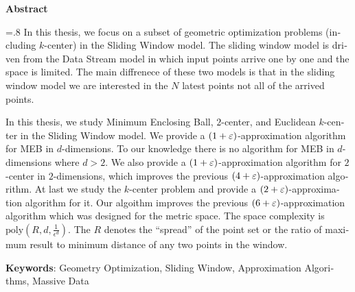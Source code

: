 


\pagestyle{empty}

\begin{latin}

\begin{center}
\textbf{Abstract}
\end{center}
\baselineskip=.8\baselineskip
In this thesis, we focus on a subset of geometric optimization problems (including $k$-center) in the Sliding Window model. The sliding window model is driven from the Data Stream model in which input points arrive one by one and the space is limited. The main diffrenece of these two models is that in the sliding window model we are interested in the $N$ latest points not all of the arrived points.

In this thesis, we study Minimum Enclosing Ball, $2$-center, and Euclidean $k$-center in the Sliding Window model. We provide a $(1+\varepsilon)$-approximation algorithm  for MEB in $d$-dimensions. To our knowledge there is no algorithm for MEB in $d$-dimensions where $d >2 $. We also provide a $(1+\varepsilon)$-approximation algorithm for $2$-center in $2$-dimensions, which improves the previous $(4+\varepsilon)$-approximation algorithm.
At last we study the $k$-center problem and provide a $(2+\varepsilon)$-approximation algorithm for it. Our algoithm improves the previous $(6+\varepsilon)$-approximation algorithm which was designed for the metric space. The space complexity is $\text{poly}(R, d, \frac{1}{\epsilon^d})$. The $R$ denotes the
“spread” of the point set or the ratio of maximum result to minimum distance of any two points in the window.



\bigskip\noindent\textbf{Keywords}:
Geometry Optimization, Sliding Window, Approximation Algorithms, Massive Data

\end{latin}

\newpage
